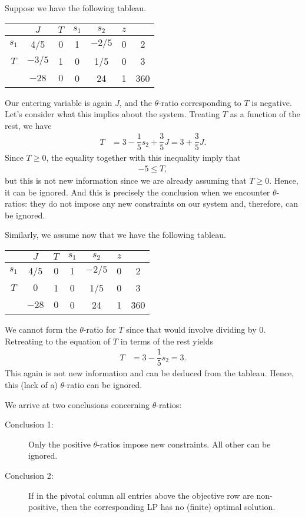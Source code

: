 \documentclass[a4paper, 12pt]{article}
\numberwithin{equation}{section}
\numberwithin{figure}{section}
\theoremstyle{definition}
\renewcommand{\leq}{\leqslant}
\renewcommand{\geq}{\geqslant}
\begin{document}
Suppose we have the following tableau.
\begin{center}
	\begin{tabular}{|c|ccccc|c|}
		\hline
		& $J$ & $T$ & $s_1$ & $s_2$ & $z$ & \\ \hline
		$s_1$ & 4/5 & 0 & 1 & $-2/5$ & 0 & 2 \\ \hline
		$T$ & $-3/5$ & 1 & 0 & 1/5 & 0 & 3 \\ \hline 
		& $-28$ & $0$ & 0 & 24 & 1 & 360 \\ \hline
	\end{tabular}
\end{center}
Our entering variable is again $J$, and the $\theta$-ratio corresponding to $T$
is negative. Let's consider what this implies about the system. Treating $T$ as
a function of the rest, we have 
\begin{align*}
	T &= 3 - \dfrac{1}{5}s_2 + \dfrac{3}{5}J = 3 + \dfrac{3}{5}J.
\end{align*}
Since $T\geq 0$, the equality together with this inequality imply that 
\begin{align*}
	-5 \leq T,
\end{align*}
but this is not new information since we are already assuming that $T\geq 0$.
Hence, it can be ignored. And this is precisely the conclusion when we encounter
$\theta$-ratios: they do not impose any new constraints on our system and,
therefore, can be ignored.

Similarly, we assume now that we have the following tableau.
\begin{center}
	\begin{tabular}{|c|ccccc|c|}
		\hline
		& $J$ & $T$ & $s_1$ & $s_2$ & $z$ & \\ \hline
		$s_1$ & 4/5 & 0 & 1 & $-2/5$ & 0 & 2 \\ \hline
		$T$ & $0$ & 1 & 0 & 1/5 & 0 & 3 \\ \hline 
		& $-28$ & $0$ & 0 & 24 & 1 & 360 \\ \hline
	\end{tabular}
\end{center}
We cannot form the $\theta$-ratio for $T$ since that would involve dividing by
$0$. Retreating to the equation of $T$ in terms of the rest yields 
\begin{align*}
	T &= 3 - \dfrac{1}{5}s_2  = 3 .
\end{align*}
This again is not new information and can be deduced from the tableau. Hence,
this (lack of a) $\theta$-ratio can be ignored.

We arrive at two conclusions concerning $\theta$-ratios:
\begin{description}
	\item[Conclusion 1:] Only the positive $\theta$-ratios impose new
	constraints. All other can be ignored.
	\item[Conclusion 2:] If in the pivotal column all entries above the
	objective row are non-positive, then the corresponding LP has no (finite)
	optimal solution.
\end{description}
\end{document}
